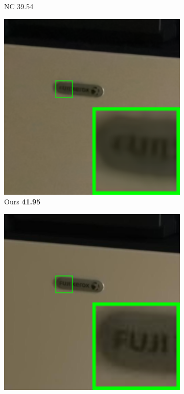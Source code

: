 \begin{figure}
\begin{subfigure}[t]{0.19\textwidth}
\caption{NC 39.54}
    \end{subfigure}
    \hfill   
    \begin{subfigure}[t]{0.19\textwidth}
        \centering
        \includegraphics[width=1\textwidth]{images/guided/our/resize_br_Guided_Canon_80D_ISO12800_IMG_2360_part10.png}
\caption{Ours \textbf{41.95}}
    \end{subfigure}
    \hfill
    \begin{subfigure}[t]{0.19\textwidth}
        \centering
        \includegraphics[width=1\textwidth]{images/guided/our/resize_br_Mean_Canon_80D_ISO12800_IMG_2360_part10.png}

\end{subfigure}
\end{figure}
